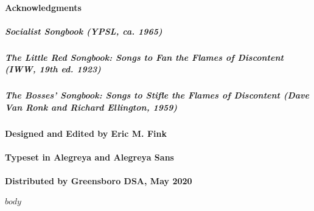 \documentclass[letterpaper,oneside,10pt]{article}
\begin{document}
\thispagestyle{empty}

\paragraph{Acknowledgments}

\subparagraph{Socialist Songbook (YPSL, ca. 1965)}
\subparagraph{The Little Red Songbook: Songs to Fan the Flames of Discontent (IWW, 19th ed. 1923)}
\subparagraph{The Bosses’ Songbook: Songs to Stifle the Flames of Discontent (Dave Van Ronk and Richard Ellington, 1959)}

\paragraph{Designed and Edited by Eric M. Fink}
\paragraph{Typeset in Alegreya and Alegreya Sans}
\paragraph{Distributed by Greensboro DSA, May 2020}

\addtocounter{page}{-1}


\setlength{\columnsep}{.5cm}
\raggedcolumns
\begin{multicols*}{2}
\thispagestyle{empty}
$body$
\end{multicols*}

\restoregeometry
\end{document}
